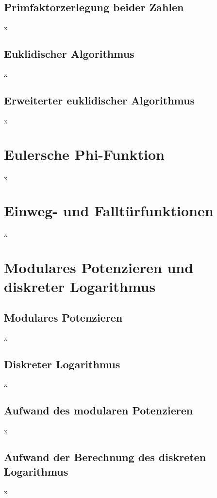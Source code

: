 \subsection{Primfaktorzerlegung beider Zahlen}
x

\subsection{Euklidischer Algorithmus}
x

\subsection{Erweiterter euklidischer Algorithmus}
x

\section{Eulersche Phi-Funktion}
x

\section{Einweg- und Falltürfunktionen}
x

\section{Modulares Potenzieren und diskreter Logarithmus}
\subsection{Modulares Potenzieren}
x

\subsection{Diskreter Logarithmus}
x

\subsection{Aufwand des modularen Potenzieren}
x

\subsection{Aufwand der Berechnung des diskreten Logarithmus}
x

